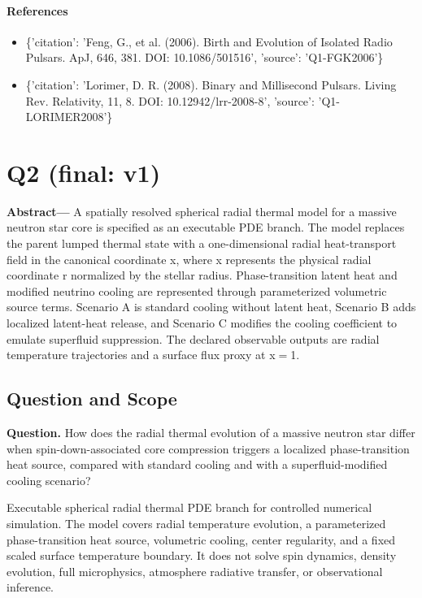 \documentclass[11pt]{article}
\begin{document}
\paragraph{References}
\begin{itemize}\raggedright
\item \{'citation': 'Feng, G., et al. (2006). Birth and Evolution of Isolated Radio Pulsars. ApJ, 646, 381. DOI: 10.1086/\allowbreak{}501516', 'source': 'Q1-FGK2006'\}
\item \{'citation': 'Lorimer, D. R. (2008). Binary and Millisecond Pulsars. Living Rev. Relativity, 11, 8. DOI: 10.12942/\allowbreak{}lrr-2008-8', 'source': 'Q1-LORIMER2008'\}
\end{itemize}

\section{Q2 (final: v1)}

\noindent\textbf{Abstract—} A spatially resolved spherical radial thermal model for a massive neutron star core is specified as an executable PDE branch. The model replaces the parent lumped thermal state with a one-dimensional radial heat-transport field in the canonical coordinate x, where x represents the physical radial coordinate r normalized by the stellar radius. Phase-transition latent heat and modified neutrino cooling are represented through parameterized volumetric source terms. Scenario A is standard cooling without latent heat, Scenario B adds localized latent-heat release, and Scenario C modifies the cooling coefficient to emulate superfluid suppression. The declared observable outputs are radial temperature trajectories and a surface flux proxy at x\ensuremath{=}1.

\subsection{Question and Scope}

\noindent\textbf{Question.} How does the radial thermal evolution of a massive neutron star differ when spin-down-associated core compression triggers a localized phase-transition heat source, compared with standard cooling and with a superfluid-modified cooling scenario?



Executable spherical radial thermal PDE branch for controlled numerical simulation. The model covers radial temperature evolution, a parameterized phase-transition heat source, volumetric cooling, center regularity, and a fixed scaled surface temperature boundary. It does not solve spin dynamics, density evolution, full microphysics, atmosphere radiative transfer, or observational inference.
\end{document}
